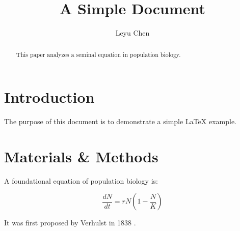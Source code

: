 \documentclass[12pt]{article}
\title{A Simple Document}
\author{Leyu Chen}
\date{}
\begin{document}
\maketitle

\begin{abstract}
This paper analyzes a seminal equation in population biology.
\end{abstract}

\section{Introduction}
The purpose of this document is to demonstrate a simple \LaTeX{} example.

\section{Materials \& Methods}
A foundational equation of population biology is:

\begin{equation}
\frac{dN}{dt} = rN(1 - \frac{N}{K})
\end{equation}

It was first proposed by Verhulst in 1838 \cite{verhulst1838notice}.



\end{document}
